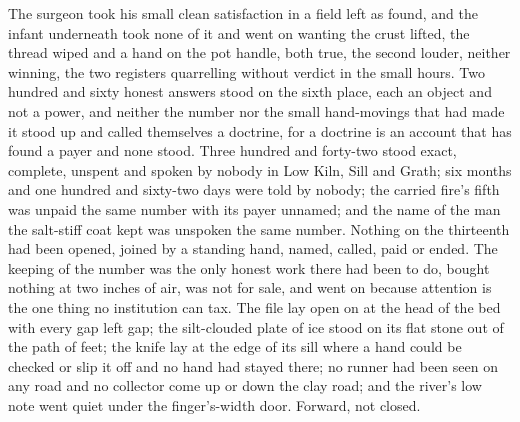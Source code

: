 The surgeon took his small clean satisfaction in a field left as found, and the infant underneath took none of it and went on wanting the crust lifted, the thread wiped and a hand on the pot handle, both true, the second louder, neither winning, the two registers quarrelling without verdict in the small hours. Two hundred and sixty honest answers stood on the sixth place, each an object and not a power, and neither the number nor the small hand-movings that had made it stood up and called themselves a doctrine, for a doctrine is an account that has found a payer and none stood. Three hundred and forty-two stood exact, complete, unspent and spoken by nobody in Low Kiln, Sill and Grath; six months and one hundred and sixty-two days were told by nobody; the carried fire's fifth was unpaid the same number with its payer unnamed; and the name of the man the salt-stiff coat kept was unspoken the same number. Nothing on the thirteenth had been opened, joined by a standing hand, named, called, paid or ended. The keeping of the number was the only honest work there had been to do, bought nothing at two inches of air, was not for sale, and went on because attention is the one thing no institution can tax. The file lay open on  at the head of the bed with every gap left gap; the silt-clouded plate of ice stood on its flat stone out of the path of feet; the knife lay at the edge of its sill where a hand could be checked or slip it off and no hand had stayed there; no runner had been seen on any road and no collector come up or down the clay road; and the river's low note went quiet under the finger's-width door. Forward, not closed.
